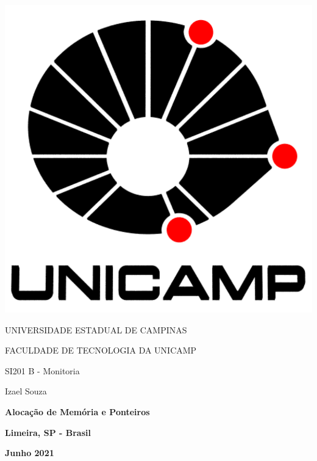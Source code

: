 \thispagestyle{empty}

\noindent\begin{minipage}{0.3\textwidth}
    \includegraphics[scale=0.15]{assets/logo-unicamp.pdf}
\end{minipage}
\hfill
\begin{minipage}{0.6\textwidth}\raggedleft
    UNIVERSIDADE ESTADUAL DE CAMPINAS

    FACULDADE DE TECNOLOGIA DA UNICAMP
    
    SI201 B - Monitoria
    
    Izael Souza
\end{minipage}
\begin{center}
    \hfill%
\end{center}

\begin{center}
    \textbf{\huge Alocação de Memória e Ponteiros}
    
\end{center}

\vspace*{\fill}
\begin{center}
    \textbf{Limeira, SP - Brasil}
    
    \textbf{Junho 2021}
\end{center}
